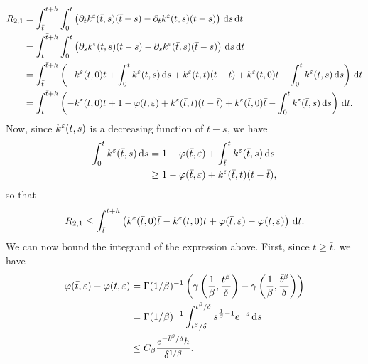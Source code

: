 \documentclass[10pt]{article}
\begin{document}
\begin{equation}
\begin{aligned}
	R_{2,1} &= \int_{\bar t}^{\bar t + h}\int_0^t \left(\partial_t k^\varepsilon(\bar t, s)(\bar t - s) - \partial_t k^\varepsilon(t, s)(t-s) \right) \,\mathrm{d} s \,\mathrm{d} t \\
	&= \int_{\bar t}^{\bar t + h} \int_0^t \left( \partial_s k^\varepsilon(t, s)(t-s) - \partial_s k^\varepsilon(\bar t, s)(\bar t - s) \right) \,\mathrm{d} s \,\mathrm{d} t \\
	&= \int_{\bar t}^{\bar t + h} \left(-k^\varepsilon(t,0)t + \int_0^t k^\varepsilon(t, s) \,\mathrm{d} s + k^\varepsilon(\bar t, t)(t - \bar t) + k^\varepsilon(\bar t, 0)\bar t - \int_0^t k^\varepsilon(\bar t, s) \,\mathrm{d} s \right)\,\mathrm{d} t\\
	&= \int_{\bar t}^{\bar t + h} \left(-k^\varepsilon(t,0)t + 1 - \varphi(t, \varepsilon) + k^\varepsilon(\bar t, t)(t - \bar t) + k^\varepsilon(\bar t, 0)\bar t -\int_0^t k^\varepsilon(\bar t, s) \,\mathrm{d} s \right) \,\mathrm{d} t.
\end{aligned}
\end{equation} 
Now, since $k^\varepsilon(t, s)$ is a decreasing function of $t-s$, we have
\begin{equation}
\begin{aligned}
	\int_0^t k^\varepsilon(\bar t, s) \,\mathrm{d} s &= 1 - \varphi(\bar t, \varepsilon) + \int_{\bar t}^{t} k^\varepsilon(\bar t, s) \,\mathrm{d} s\\
	&\geq 1 - \varphi(\bar t, \varepsilon) + k^\varepsilon(\bar t, t)(t - \bar t),
\end{aligned}
\end{equation}
so that
\begin{equation}
\begin{aligned}
	R_{2,1} \leq \int_{\bar t}^{\bar t + h} \left(k^\varepsilon(\bar t, 0)\bar t - k^\varepsilon(t,0)t + \varphi(\bar t, \varepsilon) - \varphi(t, \varepsilon) \right) \,\mathrm{d} t.
\end{aligned}
\end{equation}
We can now bound the integrand of the expression above. First, since $t \geq \bar t$, we have
\begin{equation}
\begin{aligned}
	\varphi(\bar t, \varepsilon) - \varphi(t, \varepsilon) &= \Gamma(1/\beta)^{-1}\left(\gamma\left(\frac1\beta, \frac{t^\beta}{\delta}\right) - \gamma\left(\frac1\beta, \frac{\bar t^\beta}{\delta}\right) \right)\\
	&= \Gamma(1/\beta)^{-1} \int_{\bar t^\beta/\delta}^{t^\beta / \delta} s^{\frac1\beta - 1}e^{-s} \,\mathrm{d} s\\
	&\leq  C_\beta \frac{e^{-\bar t^\beta / \delta} h}{\delta^{1/\beta}}.
\end{aligned}
\end{equation}
\end{document}
